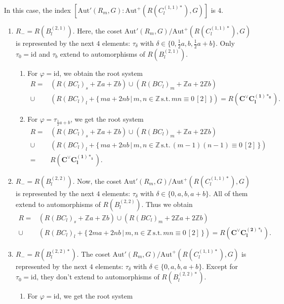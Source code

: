 \documentclass[11pt]{amsart}
\newcommand{\Z}{\mathbb{Z}}
\newcommand{\Aut}{\mathrm{Aut}}
\newcommand{\id}{\mathrm{id}}
\begin{document}
In this case, the index $[\Aut'(R_m,G):\Aut^+(R(C_l^{(1,1)\ast}),G)]$ is $4$. 
\begin{enumerate}
\item[(I)] $R_-=R(B_l^{(2,1)})$. Here, the coset $\Aut'(R_m,G)/\Aut^+(R(C_l^{(1,1)\ast}),G)$ is represented by the next $4$ elements: $\tau_\delta$ with $\delta \in \{0, \frac{1}{2}a, b, \frac{1}{2}a+b\}$. Only $\tau_0=\id$ and $\tau_b$ extend to automorphisms of $R(B_l^{(2,1)})$. 
\begin{enumerate}
\item[(i)] For $\varphi=\id$, we obtain the root system
\begin{align*}
R=
&(R(BC_l)_s+\Z a+\Z b) \cup (R(BC_l)_m+\Z a+2\Z b) \\
\cup
&(R(BC_l)_l+\{\, ma+2nb\, \vert\, m,n \in \Z\, \text{s.t.}\, mn \equiv 0\, [2]\, \})
= R(\mathbf{C^\vee C_l^{(1)\ast_0}}).
\end{align*}
\item[(ii)] For $\varphi=\tau_{\frac{1}{2}a+b}$, we get the root system
\begin{align*}
R=
&(R(BC_l)_s+\Z a+\Z b) \cup (R(BC_l)_m+\Z a+2\Z b) \\
\cup
&(R(BC_l)_l+\{\, ma+2nb\, \vert\, m,n \in \Z\, \text{s.t.}\, (m-1)(n-1) \equiv 0\, [2]\, \}) \\
= 
&R(\mathbf{C^\vee C_l^{(1)\ast_1}}).
\end{align*}
\end{enumerate}
\item[(II)] $R_-=R(B_l^{(2,2)})$. Now, the coset $\Aut'(R_m,G)/\Aut^+(R(C_l^{(1,1)\ast}),G)$ is represented by the next $4$ elements: $\tau_\delta$ with $\delta \in \{0, a, b, a+b\}$. All of them extend to automorphisms of $R(B_l^{(2,2)})$. Thus we obtain
\begin{align*}
R=
&(R(BC_l)_s+\Z a+\Z b) \cup (R(BC_l)_m+2\Z a+2\Z b) \\
\cup
&(R(BC_l)_l+\{\, 2ma+2nb\, \vert\, m,n \in \Z\, \text{s.t.}\, mn\equiv 0\, [2]\, \})
= R(\mathbf{C^\vee C_l^{(2)\ast_l}}).
\end{align*}
\item[(III)] $R_-=R(B_l^{(2,2)\ast})$.  The coset $\Aut'(R_m,G)/\Aut^+(R(C_l^{(1,1)\ast}),G)$ is represented by the next $4$ elements: $\tau_\delta$ with $\delta \in \{0, a, b, a+b\}$. Except for $\tau_0=\id$, they don't extend to automorphisms of $R(B_l^{(2,2)\ast})$.   
\begin{enumerate}
\item[(i)] For $\varphi=\id$, we get the root system
\begin{align*}

\end{align*}
\end{enumerate}
\end{enumerate}
\end{document}
